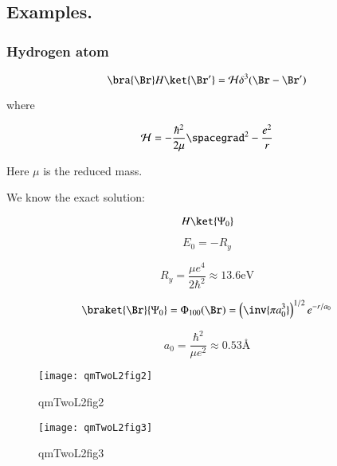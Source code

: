 \subsection{Examples.}

\subsubsection{Hydrogen atom}

\begin{equation}\label{eqn:qmTwoL2:210}
\bra{\Br} H \ket{\Br'} = \mathcal{H} \delta^3(\Br - \Br')
\end{equation}

where

\begin{equation}\label{eqn:qmTwoL2:230}
\mathcal{H} = -\frac{\hbar^2}{2 \mu} \spacegrad^2 - \frac{e^2}{r}
\end{equation}

Here $\mu$ is the reduced mass.

We know the exact solution:

\begin{equation}\label{eqn:qmTwoL2:250}
H \ket{\Psi_0}
\end{equation}

\begin{equation}\label{eqn:qmTwoL2:270}
E_0 = -R_y
\end{equation}

\begin{equation}\label{eqn:qmTwoL2:290}
R_y = \frac{\mu e^4}{2 \hbar^2} \approx 13.6 \text{eV}
\end{equation}

\begin{equation}\label{eqn:qmTwoL2:310}
\braket{\Br}{\Psi_0} = \Phi_{100}(\Br) = \left( \inv{\pi a_0^3}\right)^{1/2} e^{-r/a_0}
\end{equation}

\begin{equation}\label{eqn:qmTwoL2:330}
a_0 = \frac{\hbar^2}{\mu e^2} \approx 0.53 \text{\AA}
\end{equation}

\begin{figure}[htp]
\centering
\texttt{[image: qmTwoL2fig2]}
\caption{qmTwoL2fig2}\label{fig:qmTwoL2:2}
\end{figure}

\begin{figure}[htp]
\centering
\texttt{[image: qmTwoL2fig3]}
\caption{qmTwoL2fig3}\label{fig:qmTwoL2:3}
\end{figure}

